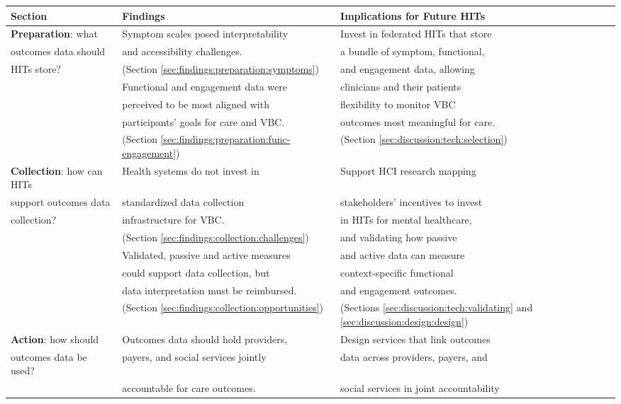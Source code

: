 \begin{table*}[t]
\begin{tabular}{lll}
\toprule
\textbf{Section} & \textbf{Findings} & \textbf{Implications for Future HITs} \\
\midrule
\textbf{Preparation}: what & Symptom scales posed interpretability & Invest in federated HITs that store \\
outcomes data should & and accessibility challenges. & a bundle of symptom, functional, \\
HITs store? & (Section \ref{sec:findings:preparation:symptoms}) & 
and engagement data, allowing \\
\cline{2--2}
& Functional and engagement data were & clinicians and their patients \\
& perceived to be most aligned with & flexibility to monitor VBC \\
& participants' goals for care and VBC. & outcomes most meaningful for care. \\
& (Section \ref{sec:findings:preparation:func-engagement}) & (Section \ref{sec:discussion:tech:selection}) \\
\midrule
\textbf{Collection}: how can HITs & Health systems do not invest in & Support HCI research mapping \\
support outcomes data & standardized data collection &stakeholders' incentives to invest\\
collection? & infrastructure for VBC. & in HITs for mental healthcare, \\
& (Section \ref{sec:findings:collection:challenges}) & and validating how passive \\
\cline{2--3}
& Validated, passive and active measures & and active data can measure \\ 
& could support data collection, but & context-specific functional \\
& data interpretation must be reimbursed. & and engagement outcomes. \\
& (Section \ref{sec:findings:collection:opportunities}) & (Sections \ref{sec:discussion:tech:validating} and \ref{sec:discussion:design:design}) \\
\midrule
\textbf{Action}: how should & Outcomes data should hold providers, & Design services that link outcomes \\ 
outcomes data be used? & payers, and social services jointly & data across providers, payers, and \\
& accountable for care outcomes. & social services in joint accountability \\

\end{tabular}
\end{table*}
